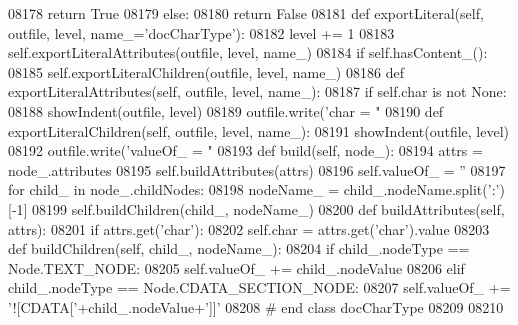 \begin{DoxyCode}
{{{{{{{{{{{{{{{{{{{{{{{{{{{{{{{{{{{{{{{{{{{{{{{{{{{{{{{{{{{{{{{{{{{{{{{{{{{{{{{{{{{{{{{{{{{{{{{{{{{{{{{{{{{{{{{{{{{{{{{{{{{{{{{{{{{{{{{{{{{{{{{{{{{{{{{{{{{{{{{{{{{{{{{{{{{{{{{{{{{{{{{{{{{{{{{{{{{{{{{{{{{{{{{{{{{{{{{{{{{{{{{{{{{{{{{{{{{{{{{{{{{{{{{{{{{{{{{{{{{{{{{{{{{{{{{{{{{{{{{{{{{{{{{{{{{{{{{{{{{{{{{{{{{{{{{{{{{{{{{{{{{{{{{{{{{{{{{{{{{{{{{{{{{{{{{{{{{{{{{{{{{{{{{{{{{{{{{{{{{{{{{{{{{{{{{{{{{{{{{{{{{{{{{{{{{{{{{{{{{{{{{{{{{{{{{{{{{{{{{{{{{{{{{{{{{{{{{{{{{{{{{{{{{{{{{{{{{{{{{{{{{{{{{{{{{{{{{{{{{{{08178             \textcolor{keywordflow}{return} \textcolor{keyword}{True}
08179         \textcolor{keywordflow}{else}:
08180             \textcolor{keywordflow}{return} \textcolor{keyword}{False}
08181     \textcolor{keyword}{def }exportLiteral(self, outfile, level, name\_='docCharType'):
08182         level += 1
08183         self.exportLiteralAttributes(outfile, level, name\_)
08184         \textcolor{keywordflow}{if} self.hasContent_():
08185             self.exportLiteralChildren(outfile, level, name\_)
08186     \textcolor{keyword}{def }exportLiteralAttributes(self, outfile, level, name\_):
08187         \textcolor{keywordflow}{if} self.char \textcolor{keywordflow}{is} \textcolor{keywordflow}{not} \textcolor{keywordtype}{None}:
08188             showIndent(outfile, level)
08189             outfile.write(\textcolor{stringliteral}{'char = "%
08190     \textcolor{keyword}{def }exportLiteralChildren(self, outfile, level, name\_):
08191         showIndent(outfile, level)
08192         outfile.write(\textcolor{stringliteral}{'valueOf\_ = "%
08193     \textcolor{keyword}{def }build(self, node\_):
08194         attrs = node\_.attributes
08195         self.buildAttributes(attrs)
08196         self.valueOf_ = \textcolor{stringliteral}{''}
08197         \textcolor{keywordflow}{for} child\_ \textcolor{keywordflow}{in} node\_.childNodes:
08198             nodeName\_ = child\_.nodeName.split(\textcolor{stringliteral}{':'})[-1]
08199             self.buildChildren(child\_, nodeName\_)
08200     \textcolor{keyword}{def }buildAttributes(self, attrs):
08201         \textcolor{keywordflow}{if} attrs.get(\textcolor{stringliteral}{'char'}):
08202             self.char = attrs.get(\textcolor{stringliteral}{'char'}).value
08203     \textcolor{keyword}{def }buildChildren(self, child\_, nodeName\_):
08204         \textcolor{keywordflow}{if} child\_.nodeType == Node.TEXT\_NODE:
08205             self.valueOf_ += child\_.nodeValue
08206         \textcolor{keywordflow}{elif} child\_.nodeType == Node.CDATA\_SECTION\_NODE:
08207             self.valueOf_ += \textcolor{stringliteral}{'![CDATA['}+child\_.nodeValue+\textcolor{stringliteral}{']]'}
08208 \textcolor{comment}{# end class docCharType}
08209 
08210 
}}}}}}}}}}}}}}}}}}}}}}}}}}}}}}}}}}}}}}}}}}}}}}}}}}}}}}}}}}}}}}}}}}}}}}}}}}}}}}}}}}}}}}}}}}}}}}}}}}}}}}}}}}}}}}}}}}}}}}}}}}}}}}}}}}}}}}}}}}}}}}}}}}}}}}}}}}}}}}}}}}}}}}}}}}}}}}}}}}}}}}}}}}}}}}}}}}}}}}}}}}}}}}}}}}}}}}}}}}}}}}}}}}}}}}}}}}}}}}}}}}}}}}}}}}}}}}}}}}}}}}}}}}}}}}}}}}}}}}}}}}}}}}}}}}}}}}}}}}}}}}}}}}}}}}}}}}}}}}}}}}}}}}}}}}}}}}}}}}}}}}}}}}}}}}}}}}}}}}}}}}}}}}}}}}}}}}}}}}}}}}}}}}}}}}}}}}}}}}}}}}}}}}}}}}}}}}}}}}}}}}}}}}}}}}}}}}}}}}}}}}}}}}}}}}}}}}}}}}}}}}}}}}}}}}}}}}}}}}}}}}}}}}}}}}}}}}}}}}}}}}}
\end{DoxyCode}
